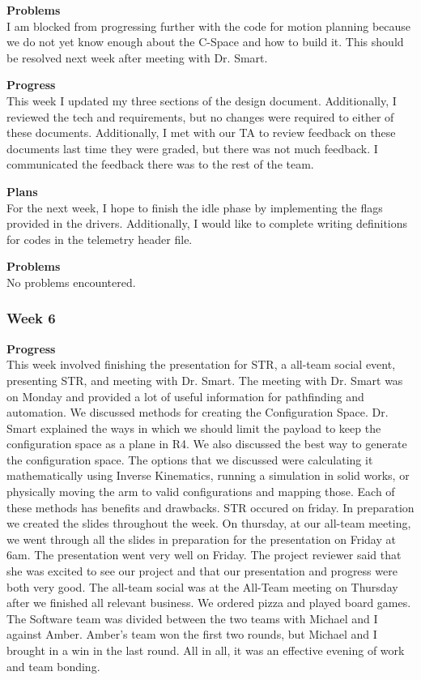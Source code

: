 \textbf{Problems} \\ 
I am blocked from progressing further with the code for motion planning because we do not yet know enough about the C-Space and how to build it. This should be resolved next week after meeting with Dr. Smart.

\textbf{Progress} \\
This week I updated my three sections of the design document. Additionally, I 
reviewed the tech and requirements, but no changes were required to either of 
these documents. Additionally, I met with our TA to review feedback on these 
documents last time they were graded, but there was not much feedback. I 
communicated the feedback there was to the rest of the team.

\textbf{Plans} \\
For the next week, I hope to finish the idle phase by implementing the flags 
provided in the drivers. Additionally, I would like to complete writing 
definitions for codes in the telemetry header file.

\textbf{Problems} \\
No problems encountered.

\subsubsection{Week 6}
\textbf{Progress} \\ 
This week involved finishing the presentation for STR, a all-team social event, presenting STR, and meeting with Dr. Smart. The meeting with Dr. Smart was on Monday and provided a lot of useful information for pathfinding and automation. We discussed methods for creating the Configuration Space. Dr. Smart explained the ways in which we should limit the payload to keep the configuration space as a plane in R4. We also discussed the best way to generate the configuration space. The options that we discussed were calculating it mathematically using Inverse Kinematics, running a simulation in solid works, or physically moving the arm to valid configurations and mapping those. Each of these methods has benefits and drawbacks. STR occured on friday. In preparation we created the slides throughout the week. On thursday, at our all-team meeting, we went through all the slides in preparation for the presentation on Friday at 6am. The presentation went very well on Friday. The project reviewer said that she was excited to see our project and that our presentation and progress were both very good. The all-team social was at the All-Team meeting on Thursday after we finished all relevant business. We ordered pizza and played board games. The Software team was divided between the two teams with Michael and I against Amber. Amber's team won the first two rounds, but Michael and I brought in a win in the last round. All in all, it was an effective evening of work and team bonding.


